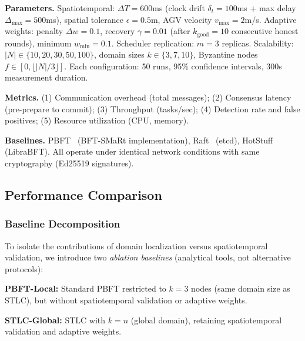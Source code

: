 \documentclass[lettersize,journal]{IEEEtran}
\begin{document}
\textbf{Parameters.} Spatiotemporal: $\Delta T = 600$ms (clock drift 
$\delta_t=100$ms + max delay $\Delta_{\max}=500$ms), spatial tolerance 
$\epsilon=0.5$m, AGV velocity $v_{\max}=2$m/s. Adaptive weights: penalty 
$\Delta w=0.1$, recovery $\gamma=0.01$ (after $k_{\text{good}}=10$ 
consecutive honest rounds), minimum $w_{\min}=0.1$. Scheduler replication: 
$m=3$ replicas. Scalability: $|N| \in \{10, 20, 30, 50, 100\}$, domain sizes $k \in \{3, 7, 10\}$, 
Byzantine nodes $f \in [0, \lfloor |N|/3 \rfloor]$.
Each configuration: 50 runs, 95\% confidence intervals, 300s measurement 
duration.

\textbf{Metrics.} (1) Communication overhead (total messages); 
(2) Consensus latency (pre-prepare to commit); (3) Throughput (tasks/sec); 
(4) Detection rate and false positives; (5) Resource utilization 
(CPU, memory).

\textbf{Baselines.} PBFT~\cite{bessani2014state} (BFT-SMaRt implementation), 
Raft~\cite{tsaliki2024accelerating} (etcd), HotStuff~\cite{carr2022towards} 
(LibraBFT). All operate under identical network conditions with same 
cryptography (Ed25519 signatures).

\subsection{Performance Comparison}

\subsubsection{Baseline Decomposition}

To isolate the contributions of domain localization versus spatiotemporal 
validation, we introduce two \textit{ablation baselines} (analytical tools, 
not alternative protocols):

\textbf{PBFT-Local:} Standard PBFT restricted to $k=3$ nodes (same domain 
size as STLC), but without spatiotemporal validation or adaptive weights.

\textbf{STLC-Global:} STLC with $k=n$ (global domain), retaining 
spatiotemporal validation and adaptive weights.
\end{document}
